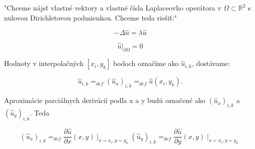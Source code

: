 \documentclass{beamer}
\begin{document}
\begin{frame}
"Chceme nájsť vlastné vektory a vlastné čísla Laplaceovho operátora v $\Omega \subset \mathbb{R}^{2}$ s nulovou Dirichletovou podmienkou. Chceme teda riešiť:"

\begin{subeqations}
\label{eq:4}
\begin{equation}
\label{eq:5}
-\Delta{\widehat{u}}=\lambda\widehat{u}
\end{equation}

\begin{equation}
\label{eq:6}
\widehat{u}|_{\partial{\Omega}}=0
\end{equation}

\end{subeqations}




Hodnoty  v interpolačných $[x_{i},y_{k}]$ bodoch označíme ako $\widehat{u}_{i,k}$, dostávame:

\begin{equation}
\label{eq:6}
\widehat{u}_{i,k}=_{def}(\widehat{u}_{x})_{i,k}=_{def}\widehat{u}(x_i,y_k).
\end{equation}

Aproximácie parciálnych derivácií podľa x a y budú označené ako $(\widehat{u}_{x})_{i,k}$ a $(\widehat{u}_{y})_{i,k}$. Teda



\begin{subequations}
\label{eq:7}
\begin{equation}
\label{eq:8}
(\widehat{u}_{x})_{i,k}=_{def}\frac{\partial \widehat{u} }{\partial x}(x,y)\mid_{x=x_i,y=y_k}
\end{equation}
\begin{equation}
\label{eq:9}
(\widehat{u}_{y})_{i,k}=_{def}\frac{\partial \widehat{u} }{\partial y}(x,y)\mid_{x=x_i,y=y_k}
\end{equation}
\end{subequations}

\end{frame}
\end{document}
